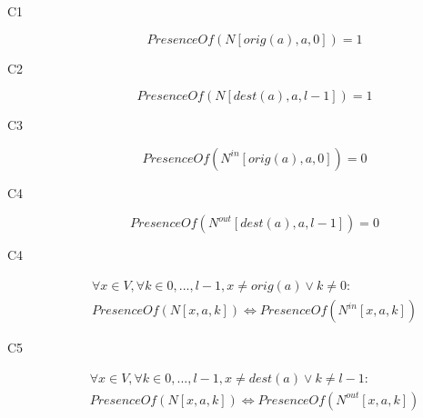 \documentclass[12pt, a4paper, hidelinks]{article}
\begin{document}
\begin{description}
\item [C1] \begin{equation} PresenceOf(N[orig(a),a,0]) = 1 \end{equation}
\item [C2] \begin{equation} PresenceOf(N[dest(a),a,l-1]) = 1 \end{equation}
\item [C3] \begin{equation} PresenceOf(N^{in}[orig(a),a,0]) = 0 \end{equation}
\item [C4] \begin{equation} PresenceOf(N^{out}[dest(a),a,l-1]) = 0 \end{equation}
\item [C4] \begin{equation}\begin{split} \forall x \in V, \forall k \in {0,...,l-1}, x \neq orig(a) \lor k \neq 0: \\ PresenceOf(N[x,a,k]) \iff PresenceOf(N^{in}[x,a,k]) \end{split}\end{equation}
\item [C5] \begin{equation}\begin{split} \forall x \in V, \forall k \in {0,...,l-1}, x \neq dest(a) \lor k \neq l-1: \\ PresenceOf(N[x,a,k]) \iff PresenceOf(N^{out}[x,a,k]) \end{split}\end{equation}


\end{description}
\end{document}
